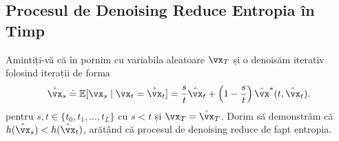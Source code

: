 \documentclass[../../book-main_ro.tex]{subfiles}
\begin{document}
\subsection{Procesul de Denoising Reduce Entropia în Timp}\label{sub:denoising_entropy_decreases}

Amintiți-vă că în  pornim cu variabila aleatoare \(\vx_{T}\) și o denoisăm iterativ folosind iterații de forma
\begin{equation}\label{eq:app_denoising_iteration}
    \hat{\vx}_{s} \doteq \Ex[\vx_{s} \mid \vx_{t} = \hat{\vx}_{t}] = \frac{s}{t}\hat{\vx}_{t} + \bp{1 - \frac{s}{t}}\bar{\vx}^{\ast}(t, \hat{\vx}_{t}).
\end{equation}
pentru \(s, t \in \{t_{0}, t_{1}, \dots, t_{L}\}\) cu \(s < t\) și \(\vx_{T} = \hat{\vx}_{T}\). Dorim să demonstrăm că \(h(\hat{\vx}_{s}) < h(\hat{\vx}_{t})\), arătând că procesul de denoising reduce de fapt entropia.
\end{document}
